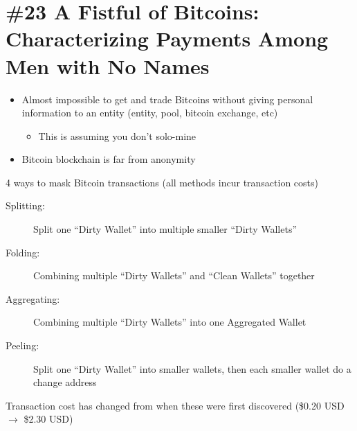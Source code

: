 \section{\#23 A Fistful of Bitcoins: Characterizing Payments Among Men with No Names}
\begin{itemize}
	\item Almost impossible to get and trade Bitcoins without giving personal information to an entity (entity, pool, bitcoin exchange, etc)
	\begin{itemize}
		\item This is assuming you don't solo-mine
	\end{itemize}
	\item Bitcoin blockchain is far from anonymity
\end{itemize}
4 ways to mask Bitcoin transactions (all methods incur transaction costs)
\begin{description}
	\item[Splitting:] Split one ``Dirty Wallet'' into multiple smaller ``Dirty Wallets''
	\item[Folding:] Combining multiple ``Dirty Wallets'' and ``Clean Wallets'' together
	\item[Aggregating:] Combining multiple ``Dirty Wallets'' into one Aggregated Wallet
	\item[Peeling:] Split one ``Dirty Wallet'' into smaller wallets, then each smaller wallet do a change address
\end{description}
Transaction cost has changed from when these were first discovered (\$0.20 USD $\rightarrow$ \$2.30 USD)